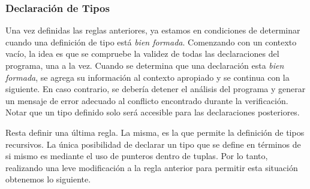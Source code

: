 \documentclass{article}
\begin{document}
\subsubsection{Declaración de Tipos}

Una vez definidas las reglas anteriores, ya estamos en condiciones de determinar cuando una definición de tipo está \textit{bien formada}.
Comenzando con un contexto vacío, la idea es que se compruebe la validez de todas las declaraciones del programa, una a la vez.
Cuando se determina que una declaración esta \textit{bien formada}, se agrega su información al contexto apropiado y se continua con la siguiente.
En caso contrario, se debería detener el análisis del programa y generar un mensaje de error adecuado al conflicto encontrado durante la verificación.
Notar que un tipo definido solo será accesible para las declaraciones posteriores.

\begin{prooftree}
\end{prooftree}

\begin{prooftree}
\end{prooftree}

\begin{prooftree}
\end{prooftree}

Resta definir una última regla.
La misma, es la que permite la definición de tipos recursivos.
La única posibilidad de declarar un tipo que se define en términos de si mismo es mediante el uso de punteros dentro de tuplas.
Por lo tanto, realizando una leve modificación a la regla anterior para permitir esta situación obtenemos lo siguiente.
\end{document}
